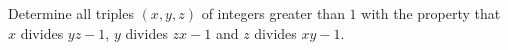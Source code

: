 %
%
%
%
%
%

\begin{problem}
	Determine all triples $(x,y,z)$ of integers greater than $1$ with the property that $x$ divides $yz-1$, $y$ divides $zx-1$ and $z$ divides $xy-1$. %
\end{problem}

%

